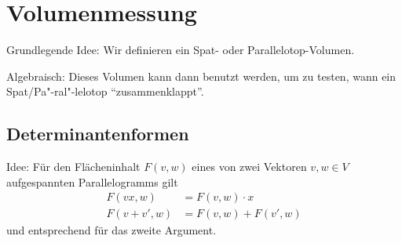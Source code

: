 \chapter{Volumenmessung}
	Grundlegende Idee: Wir definieren ein Spat- oder Parallelotop-Volumen.

	Algebraisch: Dieses Volumen kann dann benutzt werden, um zu testen, wann ein Spat/Pa"-ral"-lelotop "`zusammenklappt"'.
\section{Determinantenformen}
	Idee: Für den Flächeninhalt $ F(v,w) $ eines von zwei Vektoren $ v,w\in V $ aufgespannten Parallelogramms gilt
	\begin{align*}
		F{(vx,w)} &= F{(v,w)}\cdot x\\
		F(v+v',w) &= F(v,w)+F(v',w)
	\end{align*}
	und entsprechend für das zweite Argument.



